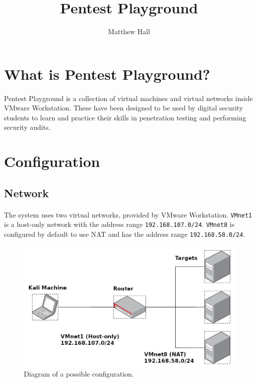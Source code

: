 \documentclass{article}
\title{Pentest Playground}
\author{Matthew Hall}
\begin{document}
\maketitle

\section{What is Pentest Playground?}

\paragraph{}
Pentest Playground is a collection of virtual machines and virtual networks inside VMware Workstation.
These have been designed to be used by digital security students to learn and practice their skills in penetration testing and performing security audits.

\section{Configuration}

\subsection{Network}

\paragraph{}
The system uses two virtual networks, provided by VMware Workstation.
\texttt{VMnet1} is a host-only network with the address range \texttt{192.168.107.0/24}.
\texttt{VMnet8} is configured by default to use NAT and has the address range \texttt{192.168.58.0/24}.

\begin{figure}[h!]
	\includegraphics[width=\linewidth]{network.png}
	\caption{Diagram of a possible configuration.}
	\label{fig:network_diagram}
\end{figure}
\end{document}
